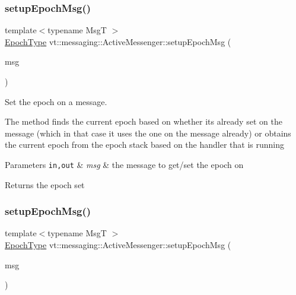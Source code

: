 \subsubsection{\texorpdfstring{setup\+Epoch\+Msg()}{setupEpochMsg()}\hspace{0.1cm}{\footnotesize\ttfamily [1/2]}}
{\footnotesize\ttfamily template$<$typename MsgT $>$ \\
\hyperlink{namespacevt_a985a5adf291c34a3ca263b3378388236}{Epoch\+Type} vt\+::messaging\+::\+Active\+Messenger\+::setup\+Epoch\+Msg (\begin{DoxyParamCaption}\item[{MsgT $\ast$}]{msg }\end{DoxyParamCaption})\hspace{0.3cm}{\ttfamily [inline]}}



Set the epoch on a message. 

The method finds the current epoch based on whether its already set on the message (which in that case it uses the one on the message already) or obtains the current epoch from the epoch stack based on the handler that is running


\begin{DoxyParams}[1]{Parameters}
\mbox{\tt in,out}  & {\em msg} & the message to get/set the epoch on\\
\hline
\end{DoxyParams}
\begin{DoxyReturn}{Returns}
the epoch set 
\end{DoxyReturn}
\mbox{\label{structvt_1_1messaging_1_1_active_messenger_ad7402f346c73b2a50ae1feb71140d891}} 
\subsubsection{\texorpdfstring{setup\+Epoch\+Msg()}{setupEpochMsg()}\hspace{0.1cm}{\footnotesize\ttfamily [2/2]}}
{\footnotesize\ttfamily template$<$typename MsgT $>$ \\
\hyperlink{namespacevt_a985a5adf291c34a3ca263b3378388236}{Epoch\+Type} vt\+::messaging\+::\+Active\+Messenger\+::setup\+Epoch\+Msg (\begin{DoxyParamCaption}\item[{\hyperlink{structvt_1_1messaging_1_1_msg_shared_ptr}{Msg\+Shared\+Ptr}$<$ MsgT $>$ const \&}]{msg }\end{DoxyParamCaption})\hspace{0.3cm}{\ttfamily [inline]}}



